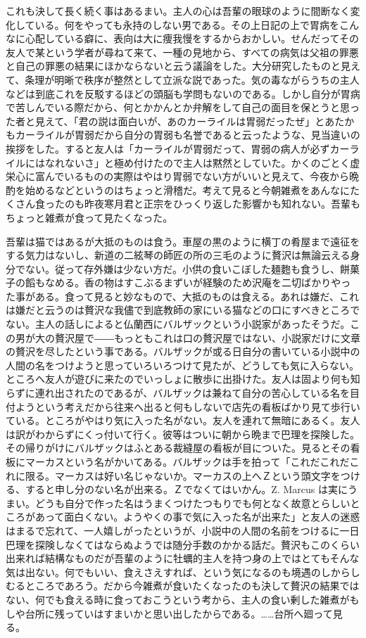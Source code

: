 \documentclass[12pt, openright]{book}
\begin{document}
これも決して長く続く事はあるまい。主人の心は吾輩の眼球のように間断なく変化している。何をやっても永持のしない男である。その上日記の上で胃病をこんなに心配している癖に、表向は大に痩我慢をするからおかしい。せんだってその友人で某という学者が尋ねて来て、一種の見地から、すべての病気は父祖の罪悪と自己の罪悪の結果にほかならないと云う議論をした。大分研究したものと見えて、条理が明晰で秩序が整然として立派な説であった。気の毒ながらうちの主人などは到底これを反駁するほどの頭脳も学問もないのである。しかし自分が胃病で苦しんでいる際だから、何とかかんとか弁解をして自己の面目を保とうと思った者と見えて、「君の説は面白いが、あのカーライルは胃弱だったぜ」とあたかもカーライルが胃弱だから自分の胃弱も名誉であると云ったような、見当違いの挨拶をした。すると友人は「カーライルが胃弱だって、胃弱の病人が必ずカーライルにはなれないさ」と極め付けたので主人は黙然としていた。かくのごとく虚栄心に富んでいるものの実際はやはり胃弱でない方がいいと見えて、今夜から晩酌を始めるなどというのはちょっと滑稽だ。考えて見ると今朝雑煮をあんなにたくさん食ったのも昨夜寒月君と正宗をひっくり返した影響かも知れない。吾輩もちょっと雑煮が食って見たくなった。

吾輩は猫ではあるが大抵のものは食う。車屋の黒のように横丁の肴屋まで遠征をする気力はないし、新道の二絃琴の師匠の所の三毛のように贅沢は無論云える身分でない。従って存外嫌は少ない方だ。小供の食いこぼした麺麭も食うし、餅菓子の饀もなめる。香の物はすこぶるまずいが経験のため沢庵を二切ばかりやった事がある。食って見ると妙なもので、大抵のものは食える。あれは嫌だ、これは嫌だと云うのは贅沢な我儘で到底教師の家にいる猫などの口にすべきところでない。主人の話しによると仏蘭西にバルザックという小説家があったそうだ。この男が大の贅沢屋で――もっともこれは口の贅沢屋ではない、小説家だけに文章の贅沢を尽したという事である。バルザックが或る日自分の書いている小説中の人間の名をつけようと思っていろいろつけて見たが、どうしても気に入らない。ところへ友人が遊びに来たのでいっしょに散歩に出掛けた。友人は固より何も知らずに連れ出されたのであるが、バルザックは兼ねて自分の苦心している名を目付ようという考えだから往来へ出ると何もしないで店先の看板ばかり見て歩行いている。ところがやはり気に入った名がない。友人を連れて無暗にあるく。友人は訳がわからずにくっ付いて行く。彼等はついに朝から晩まで巴理を探険した。その帰りがけにバルザックはふとある裁縫屋の看板が目についた。見るとその看板にマーカスという名がかいてある。バルザックは手を拍って「これだこれだこれに限る。マーカスは好い名じゃないか。マーカスの上へＺという頭文字をつける、すると申し分のない名が出来る。Ｚでなくてはいかん。Z. Marcus は実にうまい。どうも自分で作った名はうまくつけたつもりでも何となく故意とらしいところがあって面白くない。ようやくの事で気に入った名が出来た」と友人の迷惑はまるで忘れて、一人嬉しがったというが、小説中の人間の名前をつけるに一日巴理を探険しなくてはならぬようでは随分手数のかかる話だ。贅沢もこのくらい出来れば結構なものだが吾輩のように牡蠣的主人を持つ身の上ではとてもそんな気は出ない。何でもいい、食えさえすれば、という気になるのも境遇のしからしむるところであろう。だから今雑煮が食いたくなったのも決して贅沢の結果ではない、何でも食える時に食っておこうという考から、主人の食い剰した雑煮がもしや台所に残っていはすまいかと思い出したからである。\ldots{}\ldots{}台所へ廻って見る。
\end{document}
